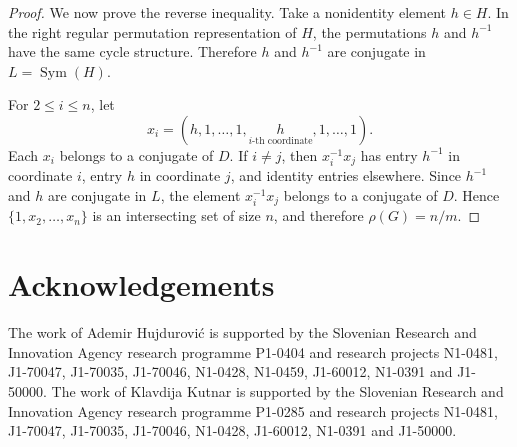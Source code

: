 \documentclass[11pt]{article}
\begin{document}
\begin{proof}
We now prove the reverse inequality.
Take a nonidentity element \(h\in H\). In the right regular
permutation representation of \(H\), the permutations \(h\) and
\(h^{-1}\) have the same cycle structure. Therefore \(h\) and
\(h^{-1}\) are conjugate in
\(
L=\operatorname{Sym}(H).
\)

For \(2\leq i\leq n\), let 
\[
x_i
=
(h,1,\ldots,1,
 \underset{i\text{-th coordinate}}{h},
 1,\ldots,1).
\]
 Each \(x_i\)
belongs to a conjugate of \(D\).
If \(i\neq j\), then
\(
x_i^{-1}x_j
\)
has entry \(h^{-1}\) in coordinate \(i\), entry \(h\) in coordinate
\(j\), and identity entries elsewhere. Since \(h^{-1}\) and \(h\)
are conjugate in \(L\), the element \(x_i^{-1}x_j\) belongs to a
conjugate of \(D\). Hence
\(
\{1,x_2,\ldots,x_n\}
\)
is an intersecting set of size \(n\), and therefore
$\rho(G)=n/m.$
\end{proof}

\section*{Acknowledgements}
{\footnotesize{
The work of Ademir Hujdurovi\' c is supported by the Slovenian Research and Innovation Agency
research programme P1-0404 and research projects N1-0481, J1-70047, J1-70035, J1-70046, N1-0428, N1-0459, J1-60012, N1-0391 and J1-50000. The work of Klavdija Kutnar is supported by the Slovenian Research and Innovation Agency
research programme P1-0285 and research projects N1-0481, J1-70047, J1-70035, J1-70046, N1-0428, J1-60012, N1-0391 and J1-50000.}}



\end{document}
